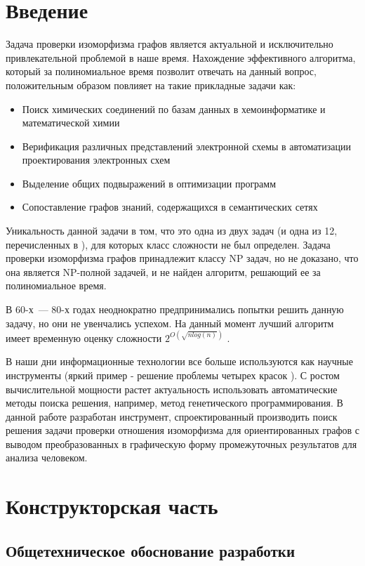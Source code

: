 \documentclass[russian,utf8,emptystyle]{eskdtext}
\begin{document}
\begin{spacing}{1.5}
\section{Введение}
Задача проверки изоморфизма графов является актуальной и исключительно привлекательной проблемой в наше время. Нахождение эффективного алгоритма, который за полиномиальное время позволит отвечать на данный вопрос, положительным образом повлияет на такие прикладные задачи как:
\begin{itemize}
\item Поиск химических соединений по базам данных в хемоинформатике и математической химии
\item Верификация различных представлений электронной схемы в автоматизации проектирования электронных схем
\item Выделение общих подвыражений в оптимизации программ
\item Сопоставление графов знаний, содержащихся в семантических сетях
\end{itemize}
Уникальность данной задачи в том, что это одна из двух задач (и одна из 12, перечисленных в \cite{GareyAndJohnson1979}), для которых класс сложности не был определен. Задача проверки изоморфизма графов принадлежит классу NP задач, но не доказано, что она является NP-полной задачей, и не найден алгоритм, решающий ее за полиномиальное время.

В 60-х~--- 80-х годах неоднократно предпринимались попытки решить данную задачу, но они не увенчались успехом. На данный момент лучший алгоритм имеет временную оценку сложности $2^{O(\sqrt{n log(n)})}$ \cite{Johnson2005} \cite{BabaiCodenotti2008}.

В наши дни информационные технологии все больше используются как научные инструменты (яркий пример - решение проблемы четырех красок \cite{FourColourProblem}). С ростом вычислительной мощности растет актуальность использовать автоматические методы поиска решения, например, метод генетического программирования. В данной работе разработан инструмент, спроектированный производить поиск решения задачи проверки отношения изоморфизма для ориентированных графов с выводом преобразованных в графическую форму промежуточных результатов для анализа человеком.

\newpage
\section{Конструкторская часть}
\subsection{Общетехническое обоснование разработки}

\end{spacing}
\end{document}

